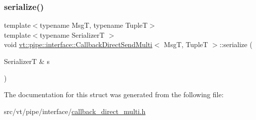 \mbox{\label{structvt_1_1pipe_1_1interface_1_1_callback_direct_send_multi_a5834e12c21fa0530d70a4aa0c1b17697}} 
\subsubsection{\texorpdfstring{serialize()}{serialize()}}
{\footnotesize\ttfamily template$<$typename MsgT, typename TupleT$>$ \\
template$<$typename SerializerT $>$ \\
void \hyperlink{structvt_1_1pipe_1_1interface_1_1_callback_direct_send_multi}{vt\+::pipe\+::interface\+::\+Callback\+Direct\+Send\+Multi}$<$ MsgT, TupleT $>$\+::serialize (\begin{DoxyParamCaption}\item[{SerializerT \&}]{s }\end{DoxyParamCaption})\hspace{0.3cm}{\ttfamily [inline]}}



The documentation for this struct was generated from the following file\+:\begin{DoxyCompactItemize}
\item 
src/vt/pipe/interface/\hyperlink{callback__direct__multi_8h}{callback\+\_\+direct\+\_\+multi.\+h}\end{DoxyCompactItemize}
